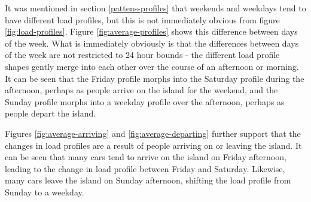 It was mentioned in section \ref{pattens-profiles} that weekends and weekdays tend to have different load profiles, but this is not immediately obvious from figure \ref{fig:load-profiles}.
Figure \ref{fig:average-profiles} shows this difference between days of the week.
What is immediately obviously is that the differences between days of the week are not restricted to 24 hour bounds - the different load profile shapes gently merge into each other over the course of an afternoon or morning.
It can be seen that the Friday profile morphs into the Saturday profile during the afternoon, perhaps as people arrive on the island for the weekend, and the Sunday profile morphs into a weekday profile over the afternoon, perhaps as people depart the island.
\par
Figures \ref{fig:average-arriving} and \ref{fig:average-departing} further support that the changes in load profiles are a result of people arriving on or leaving the island.
It can be seen that many cars tend to arrive on the island on Friday afternoon, leading to the change in load profile between Friday and Saturday.
Likewise, many cars leave the island on Sunday afternoon, shifting the load profile from Sunday to a weekday.
